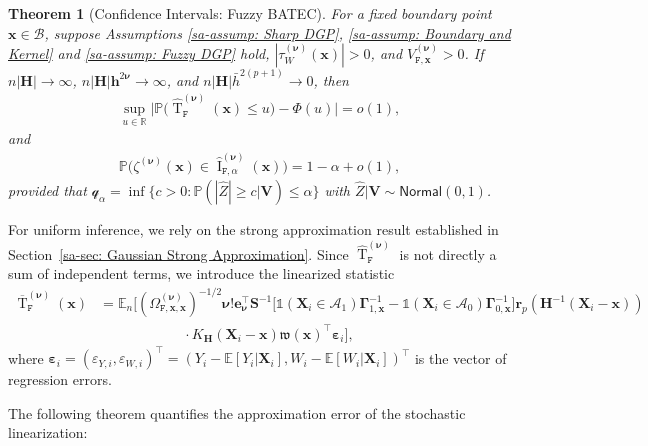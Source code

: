 \documentclass[10pt]{article}
\newtheorem{thm}{Theorem}
\DeclareMathOperator{\Tstat}{T}
\DeclareMathOperator{\CI}{I}
\renewcommand{\P}{\mathbb{P}}
\newcommand{\E}{\mathbb{E}}
\newcommand{\Indicator}{\mathds{1}}
\newcommand{\reals}{\mathbb{R}}
\newcommand{\be}{\mathbf{e}}
\newcommand{\bh}{\mathbf{h}}
\newcommand{\bH}{\mathbf{H}}
\newcommand{\br}{\mathbf{r}}
\newcommand{\bS}{\mathbf{S}}
\newcommand{\bV}{\mathbf{V}}
\newcommand{\bx}{\mathbf{x}}
\newcommand{\bX}{\mathbf{X}}
\newcommand{\bnu}{\boldsymbol{\nu}}
\newcommand{\bGamma}{\boldsymbol{\Gamma}}
\newcommand{\A}{\mathcal{A}}
\newcommand{\B}{\mathcal{B}}
\newcommand{\q}{\mathcal{q}}
\begin{document}
\begin{thm}[Confidence Intervals: Fuzzy BATEC]\label{sa-thm: Confidence Intervals: Fuzzy BATEC}
    For a fixed boundary point $\bx\in\B$, suppose Assumptions \ref{sa-assump: Sharp DGP}, \ref{sa-assump: Boundary and Kernel} and \ref{sa-assump: Fuzzy DGP} hold, $|\tau^{(\bnu)}_W(\bx)| > 0$, and $V_{\mathtt{F},\bx}^{(\bnu)}>0$. If $n |\bH| \to \infty$, $n|\bH|\bh^{2\bnu}\to\infty$, and $n |\bH| \bar{h}^{2(p+1)} \to 0$, then
    \begin{align*}
        \sup_{u \in \reals} \Big|\P \big(\widehat{\Tstat}_\mathtt{F}^{(\bnu)}(\bx) \leq u \big) - \Phi(u)\Big| = o(1),
    \end{align*}
    and
    \begin{align*}
        \P \big(\zeta^{(\bnu)}(\bx) \in \widehat{\CI}_{\mathtt{F},\alpha}^{(\bnu)}(\bx) \big) = 1 - \alpha + o(1),
    \end{align*}
    provided that $\q_{\alpha} = \inf \{c > 0: \P( |\widehat{Z}| \geq c | \bV) \leq \alpha \}$ with $\widehat{Z}|\bV \sim \mathsf{Normal}(0, 1)$.
\end{thm}

For uniform inference, we rely on the strong approximation result established in Section~\ref{sa-sec: Gaussian Strong Approximation}. Since $\widehat{\Tstat}^{(\bnu)}_{\mathtt{F}}$ is not directly a sum of independent terms, we introduce the linearized statistic
\begin{align*}
    \overline{\Tstat}_{\mathtt{F}}^{(\bnu)}(\bx)
    &=
    \E_n\Big[
    (\Omega_{\mathtt{F},\bx,\bx}^{(\bnu)})^{-1/2}
    \bnu!\be_{\bnu}^{\top}\bS^{-1}
    \big[\Indicator(\bX_i\in\A_1)\bGamma_{1,\bx}^{-1}-\Indicator(\bX_i\in\A_0)\bGamma_{0,\bx}^{-1}\big]
    \br_p(\bH^{-1}(\bX_i-\bx))\\
    &\hspace{1in} \cdot
    K_{\bH}(\bX_i-\bx) \mathfrak{w}(\bx)^\top \boldsymbol{\varepsilon}_{i}
    \Big],
\end{align*}
where $\boldsymbol{\varepsilon}_i = (\varepsilon_{Y,i}, \varepsilon_{W,i})^\top = (Y_i - \E[Y_i|\bX_i], W_i - \E[W_i|\bX_i])^\top$ is the vector of regression errors.


The following theorem quantifies the approximation error of the stochastic linearization:
\end{document}
